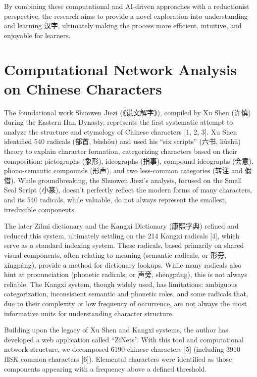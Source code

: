 \documentclass[11pt,letterpaper]{article}
\begin{document}
By combining these computational and AI-driven approaches with a
reductionist perspective, the research aims to provide a novel
exploration into understanding and learning 汉字, ultimately making the
process more efficient, intuitive, and enjoyable for learners.

\section{Computational Network Analysis on Chinese
Characters}\label{computational-network-analysis-on-chinese-characters}

The foundational work Shuowen Jiezi (《说文解字》), compiled by Xu Shen
(许慎) during the Eastern Han Dynasty, represents the first systematic
attempt to analyze the structure and etymology of Chinese characters
{[}1, 2, 3{]}. Xu Shen identified 540 radicals (部首, bùshǒu) and used
his ``six scripts'' (六书, liùshū) theory to explain character
formation, categorizing characters based on their composition:
pictographs (象形), ideographs (指事), compound ideographs (会意),
phono-semantic compounds (形声), and two less-common categories (转注
and 假借). While groundbreaking, the Shuowen Jiezi's analysis, focused
on the Small Seal Script (小篆), doesn't perfectly reflect the modern
forms of many characters, and its 540 radicals, while valuable, do not
always represent the smallest, irreducible components.

The later Zihui dictionary and the Kangxi Dictionary (康熙字典) refined
and reduced this system, ultimately settling on the 214 Kangxi radicals
{[}4{]}, which serve as a standard indexing system. These radicals,
based primarily on shared visual components, often relating to meaning
(semantic radicals, or 形旁, xíngpáng), provide a method for dictionary
lookups. While many radicals also hint at pronunciation (phonetic
radicals, or 声旁, shēngpáng), this is not always reliable. The Kangxi
system, though widely used, has limitations: ambiguous categorization,
inconsistent semantic and phonetic roles, and some radicals that, due to
their complexity or low frequency of occurrence, are not always the most
informative units for understanding character structure.

Building upon the legacy of Xu Shen and Kangxi systems, the author has
developed a web application called ``ZiNets''. With this tool and
computational network structure, we decomposed 6190 chinese characters
{[}5{]} (including 3910 HSK common characters {[}6{]}). Elemental
characters were identified as those components appearing with a
frequency above a defined threshold.
\end{document}
